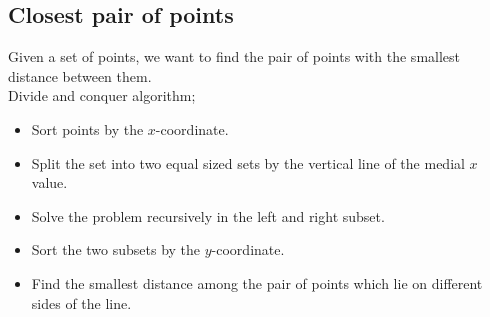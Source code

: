 \documentclass[12pt,t]{beamer}
\newcommand{\bi}{\begin{itemize}}
\newcommand{\ei}{\end{itemize}}
\begin{document}
\subsection{Closest pair of points}
\begin{frame}
  \vspace{20pt}
  Given a set of points, we want to find the pair of points with the smallest distance between them. \\
  \vspace{5pt}
  Divide and conquer algorithm;
  \bi
    \item Sort points by the $x$-coordinate.
    \item Split the set into two equal sized sets by the vertical line of the medial $x$ value.
    \item Solve the problem recursively in the left and right subset.
    \item Sort the two subsets by the $y$-coordinate.
    \item Find the smallest distance among the pair of points which lie on different sides of the line.
  \ei
\end{frame}


%
\end{document}

